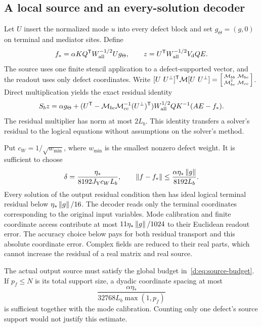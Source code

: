 \subsection{A local source and an every-solution decoder}

Let $U$ insert the normalized mode $u$ into every defect block and set $g_\Theta=(g,0)$ on terminal and mediator sites. Define
\begin{equation}\label{d:eq:ideal-maps}
 f_*=\alpha KQ^{\mathsf T}W_{\rm all}^{-1/2}Ug_\Theta,
 \qquad z=U^{\mathsf T}W_{\rm all}^{-1/2}V_{\rm d}QE.
\end{equation}
The source uses one finite stencil application to a defect-supported vector, and the readout uses only defect coordinates. Write $[U\ U^\perp]^{\mathsf T}\mathcal M[U\ U^\perp]=\left[\begin{smallmatrix}\MM_{bb}&\MM_{bc}\\\MM_{bc}^{\mathsf T}&\MM_{cc}\end{smallmatrix}\right]$. Direct multiplication yields the exact residual identity
\begin{equation}\label{d:eq:exact-residual}
 S_bz=\alpha g_\Theta+
 (U^{\mathsf T}-\mathcal M_{bc}\mathcal M_{cc}^{-1}(U^\perp)^{\mathsf T})W_{\rm all}^{1/2}QK^{-1}(AE-f_*).
\end{equation}
The residual multiplier has norm at most $2L_b$. This identity transfers a solver's residual to the logical equations without assumptions on the solver's method.

Put $c_W=1/\sqrt{w_{\min}}$, where $w_{\min}$ is the smallest nonzero defect weight. It is sufficient to choose
\begin{equation}\label{d:eq:source-budget}
 \delta=\frac{\eta_*}{8192J_{\rm Y}c_WL_b},\qquad
 \left\lVert f-f_*\right\rVert\le\frac{\alpha\eta_*\left\lVert g\right\rVert}{8192L_b}.
\end{equation}
Every solution of the output residual condition then has ideal logical
terminal residual below $\eta_*\left\lVert g\right\rVert/16$. The decoder reads only
the terminal coordinates corresponding to the original input variables.
Mode calibration and finite coordinate access contribute at most
$11\eta_*\left\lVert g\right\rVert/1024$ to their Euclidean readout error.
The accuracy choice below pays for both residual transport and this
absolute coordinate error. Complex fields are reduced to their real parts,
which cannot increase the residual of a real matrix and real source.

The actual output source must satisfy the global budget in~\eqref{d:eq:source-budget}. If $p_f\le N$ is its total support size, a dyadic coordinate spacing at most
\begin{equation}\label{d:eq:source-grid}
 \frac{\alpha\eta_*}{32768L_b\max(1,p_f)}
\end{equation}
is sufficient together with the mode calibration. Counting only one defect's source support would not justify this estimate.

